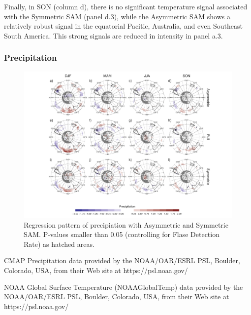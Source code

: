 \documentclass[]{ametsocV5}
\begin{document}
Finally, in SON (column d), there is no significant temperature signal
associated with the Symmetric SAM (panel d.3), while the Asymmetric SAM
shows a relatively robust signal in the equatorial Pacitic, Australia,
and even Southeast South America. This strong signals are reduced in
intensity in panel a.3.

\subsubsection{Precipitation}

\begin{figure}
\includegraphics{pp-regr-global-1} \caption[Regression pattern of precipiation with Asymmetric and Symmetric SAM]{Regression pattern of precipiation with Asymmetric and Symmetric SAM. P-values smaller than 0.05 (controlling for Flase Detection Rate) as hatched areas.}\label{fig:pp-regr-global}
\end{figure}

\acknowledgments

CMAP Precipitation data provided by the NOAA/OAR/ESRL PSL, Boulder,
Colorado, USA, from their Web site at https://psl.noaa.gov/

NOAA Global Surface Temperature (NOAAGlobalTemp) data provided by the
NOAA/OAR/ESRL PSL, Boulder, Colorado, USA, from their Web site at
https://psl.noaa.gov/



\newpage

\appendix

\end{document}
